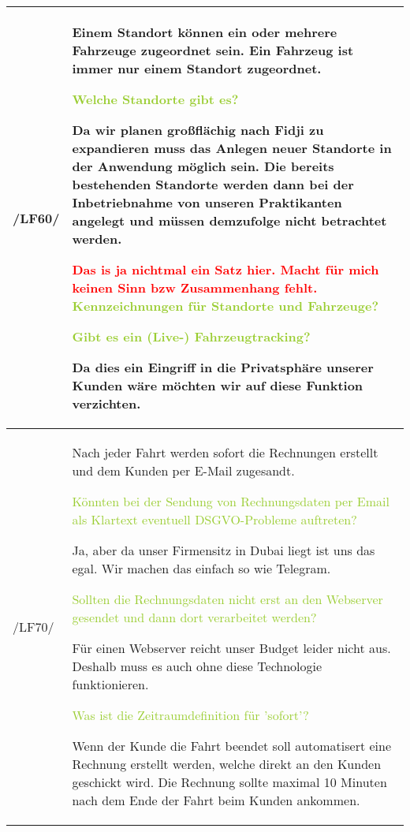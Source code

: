 \begin{tabular}[ht] {l | p{13cm}}
    \hline
    /LF60/ & Einem Standort können ein oder mehrere Fahrzeuge zugeordnet sein. Ein Fahrzeug ist immer nur einem Standort zugeordnet. 
    
    \textcolor{YellowGreen}{Welche Standorte gibt es?}

    \textcolor{NavyBlue}{Da wir planen großflächig nach Fidji zu expandieren muss das Anlegen neuer Standorte in der Anwendung möglich sein. Die bereits bestehenden Standorte werden dann bei der Inbetriebnahme von unseren Praktikanten angelegt und müssen demzufolge nicht betrachtet werden.}

    \textcolor{Red}{Das is ja nichtmal ein Satz hier. Macht für mich keinen Sinn bzw Zusammenhang fehlt.}
    \textcolor{YellowGreen}{Kennzeichnungen für Standorte und Fahrzeuge?}

    \textcolor{NavyBlue}{}
    
    \textcolor{YellowGreen}{Gibt es ein (Live-) Fahrzeugtracking?}
    
    \textcolor{NavyBlue}{Da dies ein Eingriff in die Privatsphäre unserer Kunden wäre möchten wir auf diese Funktion verzichten.}
    \\
    \hline
    /LF70/ & Nach jeder Fahrt werden sofort die Rechnungen erstellt und dem Kunden per  
    E-Mail zugesandt. 

    \textcolor{YellowGreen}{Könnten bei der Sendung von Rechnungsdaten per Email als Klartext eventuell DSGVO-Probleme auftreten?}

    \textcolor{NavyBlue}{Ja, aber da unser Firmensitz in Dubai liegt ist uns das egal. Wir machen das einfach so wie Telegram.}

    \textcolor{YellowGreen}{Sollten die Rechnungsdaten nicht erst an den Webserver gesendet und dann dort verarbeitet werden?}

    \textcolor{NavyBlue}{Für einen Webserver reicht unser Budget leider nicht aus. Deshalb muss es auch ohne diese Technologie funktionieren.}

    \textcolor{YellowGreen}{Was ist die Zeitraumdefinition für 'sofort'?}

    \textcolor{NavyBlue}{Wenn der Kunde die Fahrt beendet soll automatisert eine Rechnung erstellt werden, welche direkt an den Kunden geschickt wird. Die Rechnung sollte maximal 10 Minuten nach dem Ende der Fahrt beim Kunden ankommen.}
    \\
    \hline
\end{tabular}

